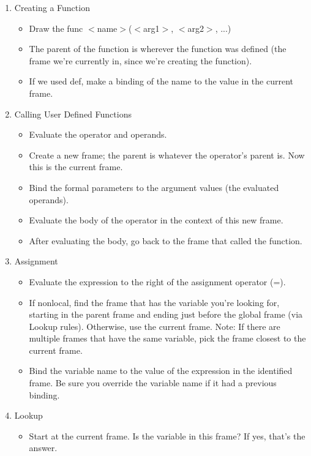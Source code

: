 \begin{blocksection}

\begin{enumerate}
    \item Creating a Function
        \begin{itemize}
            \item Draw the func $<$name$>$($<$arg1$>$, $<$arg2$>$, ...)
            \item The parent of the function is wherever the function was defined (the frame we're currently in, since we're creating the function).
            \item If we used def, make a binding of the name to the value in the current frame.
        \end{itemize}
    \item Calling User Defined Functions
		\begin{itemize}
			\item Evaluate the operator and operands.
			\item Create a new frame; the parent is whatever the operator's parent is. Now this is the current frame.
			\item Bind the formal parameters to the argument values (the evaluated operands).
			\item Evaluate the body of the operator in the context of this new frame.
			\item After evaluating the body, go back to the frame that called the function.
		\end{itemize}
    \item Assignment
    		\begin{itemize}
    			\item Evaluate the expression to the right of the assignment operator (=).
			\item If nonlocal, find the frame that has the variable you're looking for, starting in the parent frame and ending just before the global frame (via Lookup rules). Otherwise, use the current frame. Note: If there are multiple frames that have the same variable, pick the frame closest to the current frame.
			\item Bind the variable name to the value of the expression in the identified frame. Be sure you override the variable name if it had a previous binding.
    		\end{itemize}
    	\item Lookup
    		\begin{itemize}
    			\item Start at the current frame. Is the variable in this frame? If yes, that's the answer.

\end{itemize}
\end{enumerate}
\end{blocksection}

